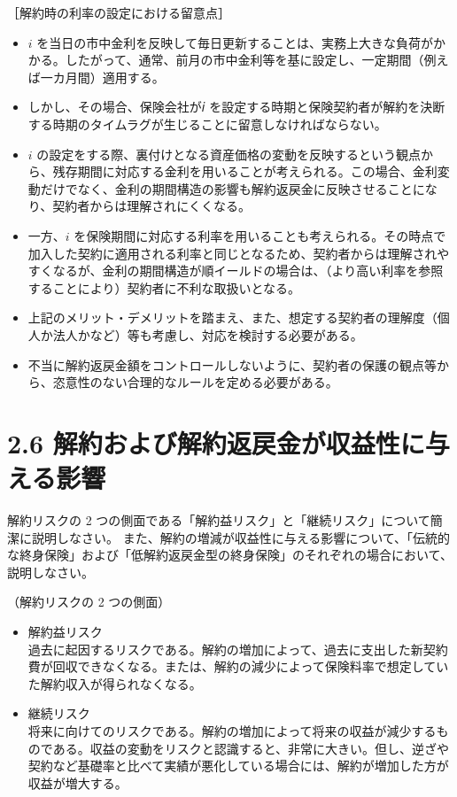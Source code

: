 \documentclass[report,gutter=10mm,fore-edge=10mm,uplatex,dvipdfmx]{jlreq}
\begin{document}
［解約時の利率の設定における留意点］
\begin{itemize}
 \item $i$ を当日の市中金利を反映して毎日更新することは、実務上大きな負荷がかかる。したがって、通常、前月の市中金利等を基に設定し、一定期間（例えば一カ月間）適用する。
 \item しかし、その場合、保険会社が𝑖 を設定する時期と保険契約者が解約を決断する時期のタイムラグが生じることに留意しなければならない。
 \item $i$ の設定をする際、裏付けとなる資産価格の変動を反映するという観点から、残存期間に対応する金利を用いることが考えられる。この場合、金利変動だけでなく、金利の期間構造の影響も解約返戻金に反映させることになり、契約者からは理解されにくくなる。
 \item 一方、$i$ を保険期間に対応する利率を用いることも考えられる。その時点で加入した契約に適用される利率と同じとなるため、契約者からは理解されやすくなるが、金利の期間構造が順イールドの場合は、（より高い利率を参照することにより）契約者に不利な取扱いとなる。
 \item 上記のメリット・デメリットを踏まえ、また、想定する契約者の理解度（個人か法人かなど）等も考慮し、対応を検討する必要がある。
 \item 不当に解約返戻金額をコントロールしないように、契約者の保護の観点等から、恣意性のない合理的なルールを定める必要がある。
\end{itemize}

\section{2.6 解約および解約返戻金が収益性に与える影響}


解約リスクの 2 つの側面である「解約益リスク」と「継続リスク」について簡潔に説明しなさい。
また、解約の増減が収益性に与える影響について、「伝統的な終身保険」および「低解約返戻金型の終身保険」のそれぞれの場合において、説明しなさい。


（解約リスクの 2 つの側面）
\begin{itemize}
 \item 解約益リスク\\
       過去に起因するリスクである。解約の増加によって、過去に支出した新契約費が回収できなくなる。または、解約の減少によって保険料率で想定していた解約収入が得られなくなる。   
 \item 継続リスク\\
       将来に向けてのリスクである。解約の増加によって将来の収益が減少するものである。収益の変動をリスクと認識すると、非常に大きい。但し、逆ざや契約など基礎率と比べて実績が悪化している場合には、解約が増加した方が収益が増大する。
\end{itemize}
\end{document}
